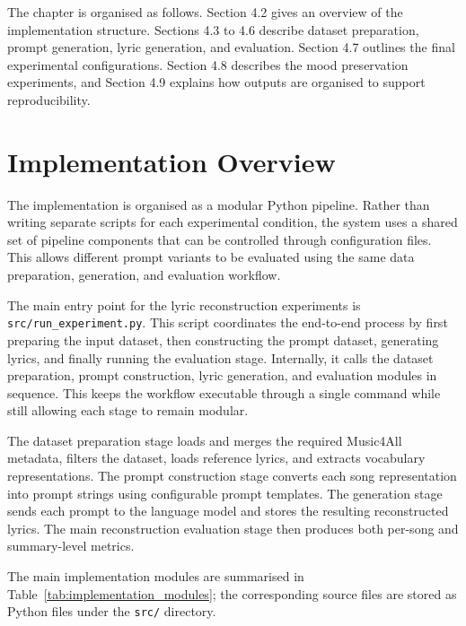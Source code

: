 The chapter is organised as follows. Section 4.2 gives an overview of the implementation structure. Sections 4.3 to 4.6 describe dataset preparation, prompt generation, lyric generation, and evaluation. Section 4.7 outlines the final experimental configurations. Section 4.8 describes the mood preservation experiments, and Section 4.9 explains how outputs are organised to support reproducibility.

\section{Implementation Overview}

The implementation is organised as a modular Python pipeline. Rather than writing separate scripts for each experimental condition, the system uses a shared set of pipeline components that can be controlled through configuration files. This allows different prompt variants to be evaluated using the same data preparation, generation, and evaluation workflow.

The main entry point for the lyric reconstruction experiments is \texttt{src/run\_experiment.py}. This script coordinates the end-to-end process by first preparing the input dataset, then constructing the prompt dataset, generating lyrics, and finally running the evaluation stage. Internally, it calls the dataset preparation, prompt construction, lyric generation, and evaluation modules in sequence. This keeps the workflow executable through a single command while still allowing each stage to remain modular.

The dataset preparation stage loads and merges the required Music4All metadata, filters the dataset, loads reference lyrics, and extracts vocabulary representations. The prompt construction stage converts each song representation into prompt strings using configurable prompt templates. The generation stage sends each prompt to the language model and stores the resulting reconstructed lyrics. The main reconstruction evaluation stage then produces both per-song and summary-level metrics.

The main implementation modules are summarised in Table~\ref{tab:implementation_modules}; the corresponding source files are stored as Python files under the \texttt{src/} directory.

